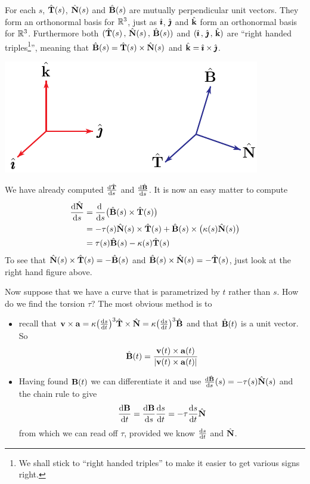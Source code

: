 For each $s$, $\hat{\mathbf{T}}(s)$, $\hat{\mathbf{N}}(s)$ and $\hat{\mathbf{B}}(s)$ are mutually
perpendicular unit vectors. They form an orthonormal basis
for $\mathbb{R}^3$, just as $\hat{\pmb{\imath}}$, $\hat{\pmb{\jmath}}$ and $\hat{\mathbf{k}}$ form an orthonormal basis
for $\mathbb{R}^3$. Furthermore both $(\hat{\mathbf{T}}(s)\,,\,\hat{\mathbf{N}}(s)\,,\,\hat{\mathbf{B}}(s))$ 
and $(\hat{\pmb{\imath}}\,,\,\hat{\pmb{\jmath}}\,,\,\hat{\mathbf{k}})$ are ``right handed triples\footnote{We shall
stick to ``right handed triples'' to make it easier to get various signs right.}'',
meaning that $\hat{\mathbf{B}}(s) = \hat{\mathbf{T}}(s)\times\hat{\mathbf{N}}(s)$ and $\hat{\mathbf{k}}=\hat{\pmb{\imath}}\times\hat{\pmb{\jmath}}$.


\begin{efig}
\begin{center}
     \includegraphics{cross.pdf}
\end{center}
\end{efig}

We have already computed $\diff{\hat\vT}{s}$ and $\diff{\hat\vB}{s}$.
It is now an easy matter to compute
\begin{align*}
\diff{\hat\vN}{s} 
&= \diff{}{s}\big(\hat\vB(s)\times\hat\vT(s)\big)\\
&= -\tau(s)\hat\vN(s)\times\hat\vT(s)
  +\hat\vB(s)\times\big(\ka(s)\hat\vN(s)\big) \\
&=\tau(s)\hat\vB(s)-\ka(s)\hat\vT(s)
\end{align*}
To see that $\hat{\mathbf{N}}(s)\times\hat{\mathbf{T}}(s)=-\hat{\mathbf{B}}(s)$ and
$\hat{\mathbf{B}}(s)\times\hat{\mathbf{N}}(s)=-\hat{\mathbf{T}}(s)$, just look at the right hand figure above.


Now suppose that we have a curve that is parametrized by $t$ rather than $s$.
How do we find the torsion $\tau$? The most obvious method is to
\begin{itemize}
\item
recall that $\vv\times\va = \ka \big(\diff{s}{t}\big)^3\hat\vT\times\hat\vN
                          = \ka \big(\diff{s}{t}\big)^3\hat\vB$
and that $\hat{\mathbf{B}}(t)$ is a unit vector. So
\begin{equation*}
\hat{\mathbf{B}}(t) = \frac{\mathbf{v}(t)\times\mathbf{a}(t)}{|\mathbf{v}(t)\times\mathbf{a}(t)|}
\end{equation*}

\item Having found $\mathbf{B}(t)$ we can differentiate it and use
$\diff{\hat\vB}{s}(s) = -\tau(s)\hat\vN(s)$ and the chain rule to give
\begin{equation*}
\diff{\vB}{t} = \diff{\vB}{s}\diff{s}{t} = -\tau\diff{s}{t} \hat\vN
\end{equation*}
from which we can read off $\tau$, provided we know $\diff{s}{t}$ and
$\hat{\mathbf{N}}$.

\end{itemize}


